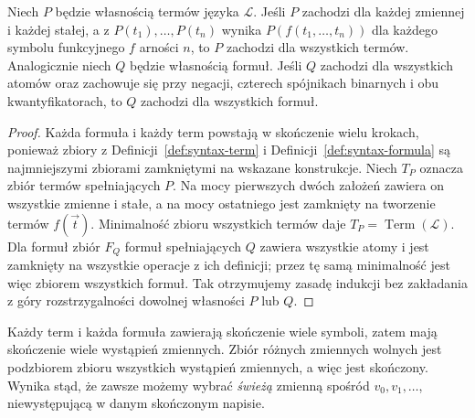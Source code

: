 \begin{twierdzenie}
\label{thm:syntax-structural-induction-xlv}
Niech $P$ będzie własnością termów języka $\mathcal L$.
Jeśli $P$ zachodzi dla każdej zmiennej i każdej stałej,
a z $P(t_1),\ldots,P(t_n)$ wynika $P(f(t_1,\ldots,t_n))$
dla każdego symbolu funkcyjnego $f$ arności $n$, to
$P$ zachodzi dla wszystkich termów.
Analogicznie niech $Q$ będzie własnością formuł.
Jeśli $Q$ zachodzi dla wszystkich atomów oraz zachowuje się
przy negacji, czterech spójnikach binarnych i obu
kwantyfikatorach, to $Q$ zachodzi dla wszystkich formuł.
\end{twierdzenie}
\begin{proof}
Każda formuła i każdy term powstają w skończenie wielu
krokach, ponieważ zbiory z Definicji~\ref{def:syntax-term}
i Definicji~\ref{def:syntax-formula} są najmniejszymi
zbiorami zamkniętymi na wskazane konstrukcje.
Niech $T_P$ oznacza zbiór termów spełniających $P$.
Na mocy pierwszych dwóch założeń zawiera on wszystkie
zmienne i stałe, a na mocy ostatniego jest zamknięty
na tworzenie termów $f(\vec t)$. Minimalność zbioru
wszystkich termów daje $T_P=\operatorname{Term}(\mathcal L)$.
Dla formuł zbiór $F_Q$ formuł spełniających $Q$
zawiera wszystkie atomy i jest zamknięty na wszystkie
operacje z ich definicji; przez tę samą minimalność
jest więc zbiorem wszystkich formuł.
Tak otrzymujemy zasadę indukcji bez zakładania z góry
rozstrzygalności dowolnej własności $P$ lub $Q$.
\end{proof}

\begin{przyklad}
Każdy term i każda formuła zawierają skończenie wiele symboli,
zatem mają skończenie wiele wystąpień zmiennych.
Zbiór różnych zmiennych wolnych jest podzbiorem zbioru wszystkich
wystąpień zmiennych, a więc jest skończony. Wynika stąd, że
zawsze możemy wybrać \emph{świeżą} zmienną spośród
$v_0,v_1,\ldots$, niewystępującą w danym skończonym napisie.
\end{przyklad}